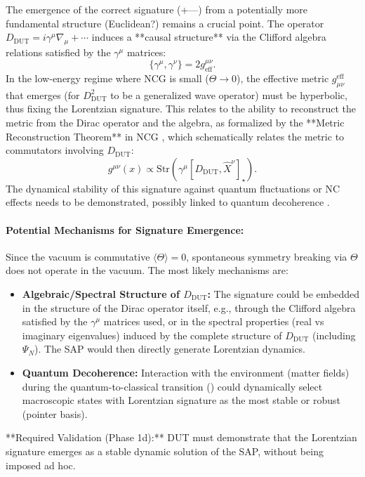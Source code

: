 \documentclass[11pt, a4paper]{article}
\theoremstyle{remark}
\newcommand{\Op}[1]{\hat{#1}}
\newcommand{\Str}{\mathrm{Str}}
\begin{document}
The emergence of the correct signature (+---) from a potentially more fundamental structure (Euclidean?) remains a crucial point. The operator \( D_{\text{DUT}} = i\gamma^\mu \nabla_\mu + \cdots \) induces a **causal structure** via the Clifford algebra relations satisfied by the \( \gamma^\mu \) matrices:
\[
\{\gamma^\mu, \gamma^\nu\} = 2g^{\mu\nu}_{\text{eff}}.
\]
In the low-energy regime where NCG is small (\( \Op{\Theta} \to 0 \)), the effective metric \( g_{\mu\nu}^{\text{eff}} \) that emerges (for \( D_{\text{DUT}}^2 \) to be a generalized wave operator) must be hyperbolic, thus fixing the Lorentzian signature. This relates to the ability to reconstruct the metric from the Dirac operator and the algebra, as formalized by the **Metric Reconstruction Theorem** in NCG \citep{Connes1994}, which schematically relates the metric to commutators involving \( D_{\text{DUT}} \):
\[
g^{\mu\nu}(x) \propto \Str\left( \gamma^\mu [D_{\text{DUT}}, \hat{X}^\nu]_\star \right).
\]
The dynamical stability of this signature against quantum fluctuations or NC effects needs to be demonstrated, possibly linked to quantum decoherence \citep{KieferQuantumGravityBook, Earman1989}.

\paragraph{Potential Mechanisms for Signature Emergence:}
Since the vacuum is commutative \( \langle \Theta \rangle = 0 \), spontaneous symmetry breaking via \( \Theta \) does not operate in the vacuum. The most likely mechanisms are:
\begin{itemize}
    \item \textbf{Algebraic/Spectral Structure of \( D_{\text{DUT}} \):} The signature could be embedded in the structure of the Dirac operator itself, e.g., through the Clifford algebra satisfied by the \( \gamma^\mu \) matrices used, or in the spectral properties (real vs imaginary eigenvalues) induced by the complete structure of \( D_{\text{DUT}} \) (including \( \Psi_N \)). The SAP would then directly generate Lorentzian dynamics.
    \item \textbf{Quantum Decoherence:} Interaction with the environment (matter fields) during the quantum-to-classical transition () could dynamically select macroscopic states with Lorentzian signature as the most stable or robust (pointer basis).
\end{itemize}
**Required Validation (Phase 1d):** DUT must demonstrate that the Lorentzian signature emerges as a stable dynamic solution of the SAP, without being imposed ad hoc.
\end{document}
